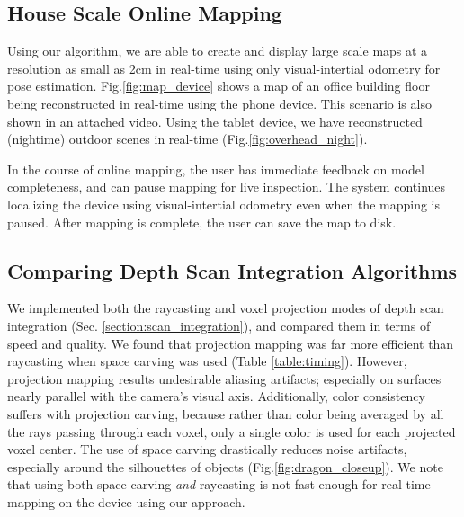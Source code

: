 \documentclass[10pt,twocolumn,letterpaper]{article}
\newcommand{\figref}[1]{Fig.\ref{#1}}
\begin{document}
%  
%  
\subsection{House Scale Online Mapping}
\label{section:mapping}
Using our algorithm, we are able to create and display large scale maps at a
resolution as small as 2cm in real-time using only visual-intertial odometry for
pose estimation. \figref{fig:map_device} shows a map of an office building floor
being reconstructed in real-time using the phone device. This scenario is also
shown in an attached video. Using the tablet device, we have reconstructed
(nightime) outdoor scenes in real-time (\figref{fig:overhead_night}).

In the course of online mapping, the user has immediate feedback on model
completeness, and can pause mapping for live inspection. The system continues
localizing the device using visual-intertial odometry even when the mapping is
paused. After mapping is complete, the user can save the map to disk.
 
\subsection{Comparing Depth Scan Integration Algorithms} 
\label{section:scan_compare}
We implemented both the raycasting and voxel projection modes of depth scan
integration (Sec. \ref{section:scan_integration}), and compared them in terms of
speed and quality. We found that projection mapping was far more efficient than
raycasting when space carving was used (Table \ref{table:timing}). However,
projection mapping results undesirable aliasing artifacts; especially on
surfaces nearly parallel with the camera's visual axis. Additionally, color consistency suffers
with projection carving, because rather than color being averaged by all the
rays passing through each voxel, only a single color is used for each projected
voxel center. The use of space carving drastically reduces noise artifacts,
especially around the silhouettes of objects (\figref{fig:dragon_closeup}). We
note that using both space carving \emph{and} raycasting is not fast enough for real-time mapping on the device
using our approach.
\end{document}

